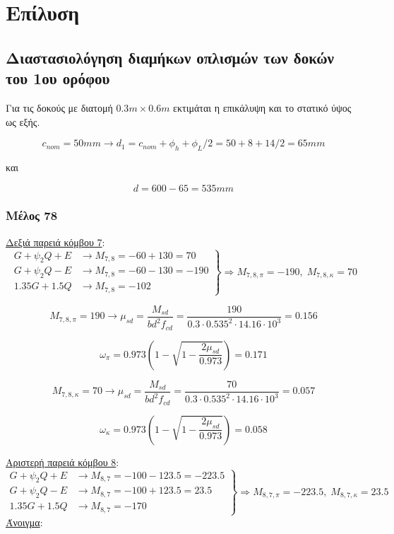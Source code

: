 \pagestyle{fancy}
\chapter{Επίλυση}
\section{Διαστασιολόγηση διαμήκων οπλισμών των δοκών του 1ου ορόφου}
Για τις δοκούς με διατομή $0.3m\times0.6m$ εκτιμάται η επικάλυψη και το στατικό ύψος ως εξής.

\[
c_{nom} = 50 mm \rightarrow d_1 = c_{nom} + \phi_h + \phi_L/2 = 50 + 8 + 14/2 = 65 mm
\]

\noindent
και

\[
d = 600 - 65 = 535 mm
\]

\subsection{Μέλος 78}
\noindent
\underline{Δεξιά παρειά κόμβου 7}:
\[
\left.
   \begin{array}{ll}
     G+\psi_2 Q + Ε & \rightarrow M_{7,8} = -60+130 = 70 \\
     G+\psi_2 Q - Ε & \rightarrow M_{7,8} = -60-130 = -190 \\
     1.35G + 1.5Q     & \rightarrow M_{7,8} = -102
   \end{array}
\right\} \Rightarrow M_{7,8,\pi} = -190,\; M_{7,8,\kappa} = 70
\]

\[
M_{7,8,\pi} = 190 \rightarrow \mu_{sd} = \dfrac{M_{sd}}{b d^2 f_{cd}} = \dfrac{190}{0.3\cdot0.535^2\cdot14.16\cdot10^3} = 0.156
\]

\[
\omega_{\pi} = 0.973\left( 1 - \sqrt{1 - \dfrac{2\mu_{sd}}{0.973}} \right) = 0.171
\]

\[
M_{7,8,\kappa} = 70 \rightarrow \mu_{sd} = \dfrac{M_{sd}}{b d^2 f_{cd}} = \dfrac{70}{0.3\cdot0.535^2\cdot14.16\cdot10^3} = 0.057
\]

\[
\omega_{\kappa} = 0.973\left( 1 - \sqrt{1 - \dfrac{2\mu_{sd}}{0.973}} \right) = 0.058
\]

\noindent
\underline{Αριστερή παρειά κόμβου 8}:
\[
\left.
   \begin{array}{ll}
       G+\psi_2 Q + Ε & \rightarrow M_{8,7} = -100-123.5 = -223.5 \\
       G+\psi_2 Q - Ε & \rightarrow M_{8,7} = -100+123.5 = 23.5 \\
       1.35G + 1.5Q     & \rightarrow M_{8,7} = -170
   \end{array}
\right \} \Rightarrow M_{8,7,\pi} = -223.5,\; M_{8,7,\kappa} = 23.5
\]
\noindent
\underline{Άνοιγμα}:

